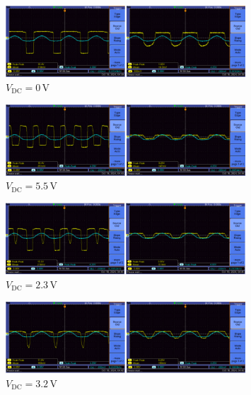 \documentclass{article}
\begin{document}
\begin{figure}[H]
    \centering
    \includegraphics[width=0.8\textwidth]{img/Lab 8/3_2.png} %
    \caption{ \( V_{\text{DC}} = 0\,\text{V} \) }
\end{figure}

\begin{figure}[H]
    \centering
    \includegraphics[width=0.8\textwidth]{img/Lab 8/3_3.png} %
    \caption{ \( V_{\text{DC}} = 5.5\,\text{V} \) }
\end{figure}

\begin{figure}[H]
    \centering
    \includegraphics[width=0.8\textwidth]{img/Lab 8/3_4.png} %
    \caption{ \( V_{\text{DC}} = 2.3\,\text{V} \) }
\end{figure}

\begin{figure}[H]
    \centering
    \includegraphics[width=0.8\textwidth]{img/Lab 8/3_5.png} %
    \caption{ \( V_{\text{DC}} = 3.2\,\text{V} \) }
\end{figure}
\end{document}
